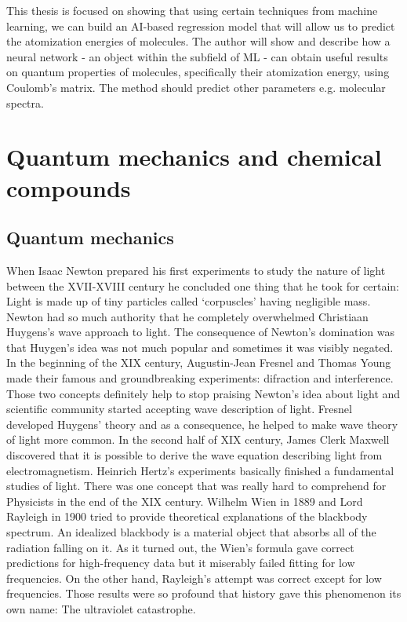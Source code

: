 \documentclass[a4paper,oneside,openright,11pt]{book}
\begin{document}
This thesis is focused on showing that using certain techniques from machine learning, we can build an AI-based regression model that will allow us to predict the atomization energies of molecules. The author will show and describe how a neural network - an object within the subfield of ML - can obtain useful results on quantum properties of molecules, specifically their atomization energy, using Coulomb's matrix. The method should predict other parameters e.g. molecular spectra.

\chapter{Quantum mechanics and chemical compounds}

\section{Quantum mechanics}

When Isaac Newton prepared his first experiments to study the nature of light between the XVII-XVIII century he concluded one thing that he took for certain: Light is made up of tiny particles called ‘corpuscles’ having negligible mass. Newton had so much authority that he completely overwhelmed Christiaan Huygens's wave approach to light. The consequence of Newton's domination was that Huygen's idea was not much popular and sometimes it was visibly negated. In the beginning of the XIX century, Augustin-Jean Fresnel and Thomas Young made their famous and groundbreaking experiments: difraction and interference. Those two concepts definitely help to stop praising Newton's idea about light and scientific community started accepting wave description of light. Fresnel developed Huygens' theory and as a consequence, he helped to make wave theory of light more common. In the second half of XIX century, James Clerk Maxwell discovered that it is possible to derive the wave equation describing light from electromagnetism. Heinrich Hertz's experiments basically finished a fundamental studies of light. There was one concept that was really hard to comprehend for Physicists in the end of the XIX century. Wilhelm Wien in 1889 and Lord Rayleigh in 1900 tried to provide theoretical explanations of the blackbody spectrum. An idealized blackbody is a material object that absorbs all of the radiation falling on it. As it turned out, the Wien's formula gave correct predictions for high-frequency data but it miserably failed fitting for low frequencies. On the other hand, Rayleigh's attempt was correct except for low frequencies. Those results were so profound that history gave this phenomenon its own name: The ultraviolet catastrophe.
\end{document}

